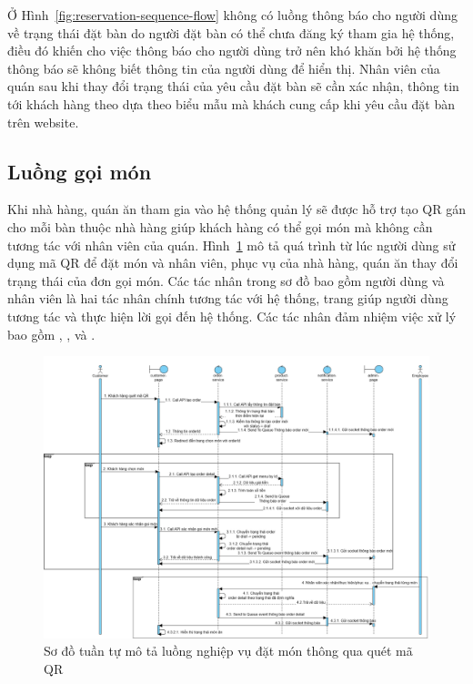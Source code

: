 Ở Hình~\ref{fig:reservation-sequence-flow} không có luồng thông báo cho người dùng về trạng thái đặt bàn do người đặt bàn có thể chưa đăng ký tham gia hệ thống, điều đó khiến cho việc thông báo cho người dùng trở nên khó khăn bởi hệ thống thông báo sẽ không biết thông tin của người dùng để hiển thị.
Nhân viên của quán sau khi thay đổi trạng thái của yêu cầu đặt bàn sẽ cần xác nhận, thông tin tới khách hàng theo dựa theo biểu mẫu mà khách cung cấp khi yêu cầu đặt bàn trên website.
\subsection{Luồng gọi món}\label{sec:order-sequence-flow}
Khi nhà hàng, quán ăn tham gia vào hệ thống quản lý sẽ được hỗ trợ tạo QR gán cho mỗi bàn thuộc nhà hàng giúp khách hàng có thể gọi món mà không cần tương tác với nhân viên của quán.
Hình~\ref{fig:order-sequence-flow} mô tả quá trình từ lúc người dùng sử dụng mã QR để đặt món và nhân viên, phục vụ của nhà hàng, quán ăn thay đổi trạng thái của đơn gọi món.
Các tác nhân trong sơ đồ bao gồm người dùng và nhân viên là hai tác nhân chính tương tác với hệ thống, trang  giúp người dùng tương tác và thực hiện lời gọi đến hệ thống.
Các tác nhân đảm nhiệm việc xử lý bao gồm , , và .

\begin{figure}[h]
	\centering
	\includegraphics[width=1.1\textwidth]{images/hChip/main-flow/order.png}
	\caption{Sơ đồ tuần tự mô tả luồng nghiệp vụ đặt món thông qua quét mã QR}
	\label{fig:order-sequence-flow}
\end{figure}

